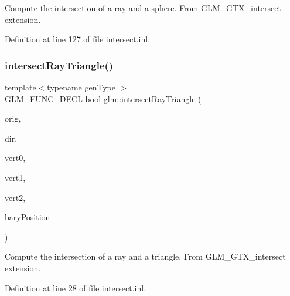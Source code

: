 Compute the intersection of a ray and a sphere. From G\+L\+M\+\_\+\+G\+T\+X\+\_\+intersect extension. 

Definition at line 127 of file intersect.\+inl.

\mbox{\label{group__gtx__intersect_gab16c1b47c10451e7604b51b39a7ef21d}} 
\subsubsection{\texorpdfstring{intersectRayTriangle()}{intersectRayTriangle()}}
{\footnotesize\ttfamily template$<$typename gen\+Type $>$ \\
\mbox{\hyperlink{setup_8hpp_ab2d052de21a70539923e9bcbf6e83a51}{G\+L\+M\+\_\+\+F\+U\+N\+C\+\_\+\+D\+E\+CL}} bool glm\+::intersect\+Ray\+Triangle (\begin{DoxyParamCaption}\item[{gen\+Type const \&}]{orig,  }\item[{gen\+Type const \&}]{dir,  }\item[{gen\+Type const \&}]{vert0,  }\item[{gen\+Type const \&}]{vert1,  }\item[{gen\+Type const \&}]{vert2,  }\item[{gen\+Type \&}]{bary\+Position }\end{DoxyParamCaption})}

Compute the intersection of a ray and a triangle. From G\+L\+M\+\_\+\+G\+T\+X\+\_\+intersect extension. 

Definition at line 28 of file intersect.\+inl.

